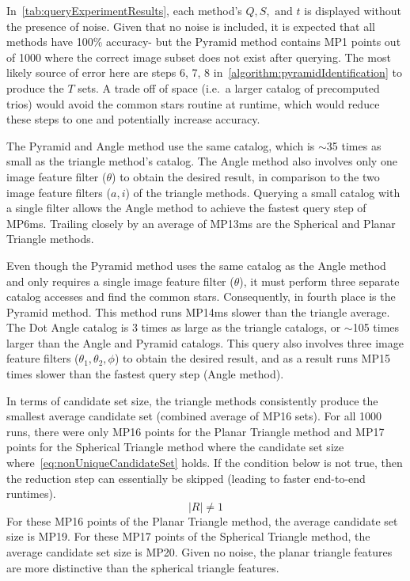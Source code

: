 In~\autoref{tab:queryExperimentResults}, each method's $Q, S, \text{ and } t$ is displayed without the presence of
noise.
Given that no noise is included, it is expected that all methods have 100\% accuracy- but the Pyramid method contains
MP1 points out of 1000 where the correct image subset does not exist after querying.
The most likely source of error here are steps 6, 7, 8 in~\autoref{algorithm:pyramidIdentification} to produce the
$T$ sets.
A trade off of space (i.e.\ a larger catalog of precomputed trios) would avoid the common stars routine at runtime,
which would reduce these steps to one and potentially increase accuracy.

The Pyramid and Angle method use the same catalog, which is $\sim$35 times as small as the triangle method's catalog.
The Angle method also involves only one image feature filter ($\theta$) to obtain the desired result, in comparison
to the two image feature filters ($a, i$) of the triangle methods.
Querying a small catalog with a single filter allows the Angle method to achieve the fastest query step of MP6ms.
Trailing closely by an average of MP13ms are the Spherical and Planar Triangle methods.

Even though the Pyramid method uses the same catalog as the Angle method and only requires a single image feature
filter ($\theta$), it must perform three separate catalog accesses and find the common stars.
Consequently, in fourth place is the Pyramid method.
This method runs MP14ms slower than the triangle average.
The Dot Angle catalog is 3 times as large as the triangle catalogs, or $\sim$105 times larger than the Angle and Pyramid
catalogs.
This query also involves three image feature filters ($\theta_1, \theta_2, \phi$) to obtain the desired result, and
as a result runs MP15 times slower than the fastest query step (Angle method).

In terms of candidate set size, the triangle methods consistently produce the smallest average candidate set
(combined average of MP16 sets).
For all 1000 runs, there were only MP16 points for the Planar Triangle method and MP17 points for the Spherical Triangle
method where the candidate set size where~\autoref{eq:nonUniqueCandidateSet} holds.
If the condition below is not true, then the reduction step can essentially be skipped (leading to faster end-to-end
runtimes).
\begin{equation}\label{eq:nonUniqueCandidateSet}
    |R| \neq 1
\end{equation}
For these MP16 points of the Planar Triangle method, the average candidate set size is MP19.
For these MP17 points of the Spherical Triangle method, the average candidate set size is MP20.
Given no noise, the planar triangle features are more distinctive than the spherical triangle features.

